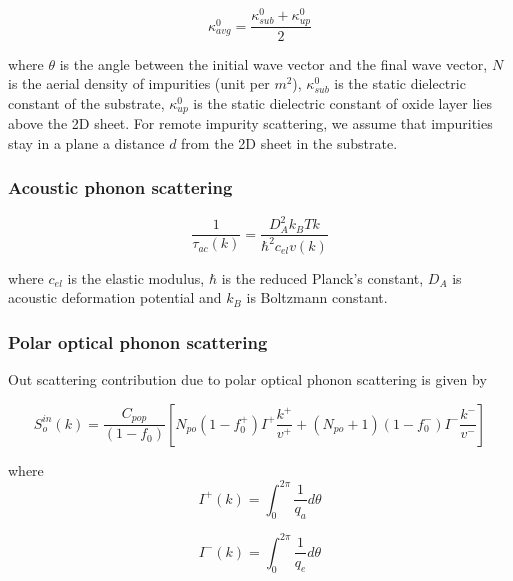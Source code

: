 \documentclass[12pt]{article}
\begin{document}
\begin{equation}
\kappa_{avg}^0 = \frac{\kappa_{sub}^0 + \kappa_{up}^0}{2} 
\end{equation}

where $\theta $ is the angle between the initial wave vector and the final wave vector, $N$ is the aerial density of impurities (unit per $m^2$),   $\kappa_{sub}^0$ is the static dielectric constant of the substrate, $\kappa_{up}^0$ is the static dielectric constant of oxide layer lies above the 2D sheet. For remote impurity scattering, we assume that impurities stay in a plane a distance $d$ from the 2D sheet in the substrate.

\subsubsection{Acoustic phonon scattering}

\cite{zha2016thermal}

\begin{equation}
\frac{1}{\tau_{ac}(k)} = \frac{D_{A}^2 k_{B} T k}{\hbar^2 c_{el} v(k)} 
\label{acoustic_rate}
\end{equation}

where $ c_{el} $ is the elastic modulus, $ \hbar $ is the reduced Planck's constant, $D_A$ is acoustic deformation potential and $ k_{B} $ is Boltzmann constant. 

\subsubsection{Polar optical phonon scattering}

Out scattering contribution due to polar optical phonon scattering is given by \cite{nag2012electron, kawamura1992phonon}

\begin{equation}
S_{o}^{in}(k) = \frac{C_{pop}}{(1- f_{0})} [N_{po} (1 - f_{0}^+) I^+ \frac{k^+}{v^+}  + (N_{po}+1) (1 - f_{0}^-) I^- \frac{k^-}{v^-}]
\label{out_sc_pop}
\end{equation}

where 
\begin{equation}
I^{+}(k) = \int_0^{2\pi} \frac{1}{q_{a}} d\theta 
\label{J_plus}
\end{equation}

\begin{equation}
I^{-}(k) = \int_0^{2\pi} \frac{1}{q_{e}} d\theta 
\label{J_plus}
\end{equation}
\end{document}
